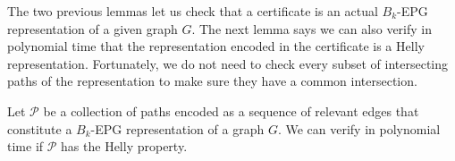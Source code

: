 





 
 
 
The two previous lemmas let us check that a certificate is an actual $B_k$-EPG representation of a given graph $G$.  The next lemma says we can also verify in polynomial time that the representation encoded in the certificate is a Helly representation. Fortunately, we do not need to check every subset of intersecting paths of the representation to make sure they have a common intersection. 


\begin{lemma}\label{lem:verify3}
Let $\mathcal{P}$ be a collection of paths encoded as a sequence of relevant edges that constitute a  $B_k$-EPG representation of a graph $G$. We can verify in polynomial time if $\mathcal{P}$ has the Helly property.
\end{lemma}


